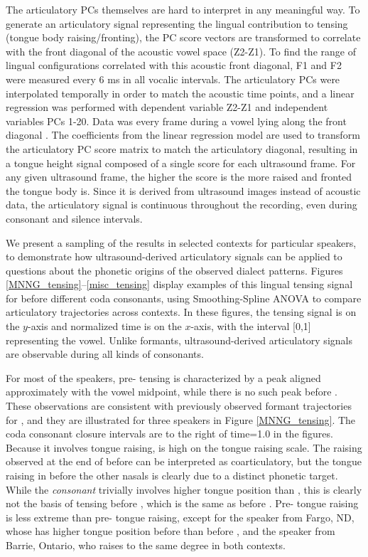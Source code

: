 \documentclass[output=paper]{LSP/langsci}
\begin{document}
The articulatory PCs themselves are hard to interpret in any meaningful way.  To generate an articulatory signal representing the lingual contribution to tensing (tongue body raising/fronting), the PC score vectors are transformed to correlate with the front diagonal of the acoustic vowel space (Z2-Z1). To find the range of lingual configurations correlated with this acoustic front diagonal, F1 and F2 were measured every 6 ms in all vocalic intervals.  The articulatory PCs were interpolated temporally in order to match the acoustic time points, and a linear regression was performed with dependent variable Z2-Z1 and independent variables PCs 1-20. Data was every frame during a vowel lying along the front diagonal . The coefficients from the linear regression model are used to transform the articulatory PC score matrix to match the articulatory diagonal, resulting in a tongue height signal composed of a single score for each ultrasound frame. For any given ultrasound frame, the higher the score is the more raised and fronted the tongue body is.  Since it is derived from ultrasound images instead of acoustic data, the articulatory signal is continuous throughout the recording, even during consonant and silence intervals.

We present a sampling of the results in selected contexts for particular speakers, to demonstrate how ultrasound-derived articulatory signals can be applied to questions about the phonetic origins of the observed dialect patterns.  Figures \ref{MNNG_tensing}--\ref{misc_tensing} display examples of this lingual tensing signal for \ips{\ae} before different coda consonants, using Smoothing-Spline ANOVA \citep{gu_smoothing_2002} to compare articulatory trajectories across contexts. In these figures, the tensing signal is on the $y$-axis and normalized time is on the $x$-axis, with the interval [0,1] representing the vowel.  Unlike formants, ultrasound-derived articulatory signals are observable during all kinds of consonants.

For most of the speakers, pre- tensing is characterized by a peak aligned approximately with the vowel midpoint, while there is no such peak before .  These observations are consistent with previously observed formant trajectories for \ips{\ae}, and they are illustrated for three speakers in Figure \ref{MNNG_tensing}.  The coda consonant closure intervals are to the right of time=1.0 in the figures. Because it involves tongue raising,  is high on the tongue raising scale. The raising observed at the end of \ips{\ae} before  can be interpreted as coarticulatory, but the tongue raising in \ips{\ae} before the other nasals is clearly due to a distinct phonetic target.  While the \textit{consonant}  trivially involves higher tongue position than , this is clearly not the basis of \ips{\ae} tensing before , which is the same as before . Pre- tongue raising is less extreme than pre- tongue raising, except for the speaker from Fargo, ND, whose \ips{\ae} has higher tongue position before  than before , and the speaker from Barrie, Ontario, who raises to the same degree in both contexts.
\end{document}
